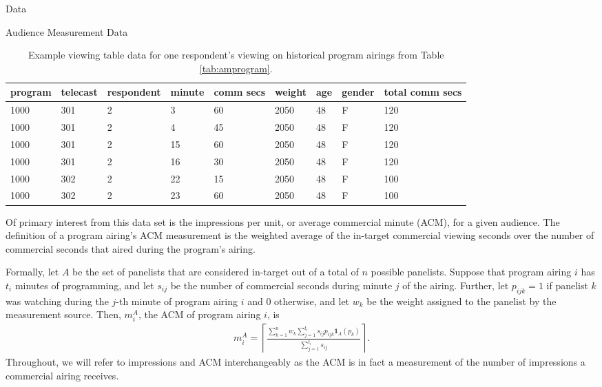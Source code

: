 \begin{chapter}{Data}
\begin{section}{Audience Measurement Data}
  \begin{table}[h!]
    \centering
    \begin{adjustbox}{width=1.1\textwidth,center=\textwidth}
      \large
    \begin{tabular}{lllllllll}
      program & telecast & respondent & minute & comm secs & weight & age & gender & total comm secs\\
      \hline
      1000 & 301 & 2 & 3 & 60 & 2050 & 48 & F & 120\\
      1000 & 301 & 2 & 4 & 45 & 2050 & 48 & F & 120\\
      1000 & 301 & 2 & 15 & 60 & 2050 & 48 & F & 120\\
      1000 & 301 & 2 & 16 & 30 & 2050 & 48 & F & 120\\
      1000 & 302 & 2 & 22 & 15 & 2050 & 48 & F & 100\\
      1000 & 302 & 2 & 23 & 60 & 2050 & 48 & F & 100
    \end{tabular}
    \end{adjustbox}
    \caption{Example viewing table data for one respondent's viewing on historical program airings from Table \ref{tab:amprogram}.}\label{tab:amviewing}
  \end{table}

  Of primary interest from this data set is the impressions per unit,
  or average commercial minute (ACM), for a given audience.
  The definition of a program airing's ACM measurement is the weighted average
  of the in-target commercial viewing seconds over the number of commercial seconds
  that aired during the program's airing.

  Formally, let $A$ be the set of panelists that are considered in-target out of a total of $n$ possible panelists.
  Suppose that program airing $i$ has $t_i$ minutes of programming, and let
  $s_{ij}$ be the number of commercial seconds during minute $j$ of the airing.
  Further, let $p_{ijk} = 1$ if panelist $k$ was watching during the $j$-th minute of program airing $i$ and 0 otherwise,
  and let $w_{k}$ be the weight assigned to the panelist by the measurement source. Then, $m_{i}^A$, the ACM of program airing $i$,
  is
  \begin{align}\label{acm_def}
    m_{i}^A = \left\lceil\frac{\sum_{k=1}^n w_k \sum_{j=1}^{t_i} s_{ij} p_{ijk} \textbf{1}_A(p_{k})}{\sum_{j=1}^{t_i} s_{ij}}\right\rceil.
  \end{align}
  Throughout, we will refer to impressions and ACM interchangeably as the ACM is in fact a measurement
  of the number of impressions a commercial airing receives.


\end{section}
\end{chapter}
